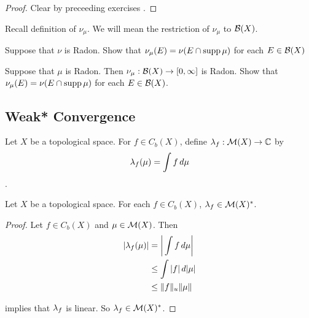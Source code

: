\documentclass{book}
\begin{document}
	\begin{proof}
		Clear by preceeding exercises .
	\end{proof}


	\begin{note}
		Recall definition of $\nu_\mu$. We will mean the restriction of $\nu_{\mu}$ to $\mathcal{B}(X)$.
	\end{note}

	\begin{ex}
		Suppose that $\nu$ is Radon. Show that $\nu_{\mu}(E) = \nu(E \cap \operatorname{supp} \mu)$ for each $E \in \mathcal{B}(X)$
	\end{ex}


	\begin{ex}
		Suppose that $\mu$ is Radon. Then $\nu_{\mu}: \mathcal{B}(X) \rightarrow [0,\infty]$ is Radon. Show that $\nu_{\mu}(E) = \nu(E \cap \operatorname{supp} \mu)$ for each $E \in \mathcal{B}(X)$. 
	\end{ex}








	
	
	
	
	
	
	
	
	
	
	
	
	
	
	
	
	
	
	
	
	
	
	
	
	
	
	
	\newpage	
	\subsection{Weak* Convergence}
	\begin{defn}
		Let $X$ be a topological space. For $f \in C_b(X)$, define $\lambda_f: \mathcal{M}(X) \rightarrow \mathbb{C}$ by $$\lambda_f(\mu) = \int f \, d \mu$$.
	\end{defn}
	
	\begin{ex}
		Let $X$ be a topological space. For each $f \in C_b(X)$, $\lambda_f \in \mathcal{M}(X)^*$. 
	\end{ex}
	
	\begin{proof}
		Let $f \in C_b(X)$ and $\mu \in \mathcal{M}(X)$. Then 
		\begin{align*}
			|\lambda_f(\mu)| 
			&= \bigg | \int f \, d \mu \bigg| \\
			&\leq \int |f| \, d |\mu| \\
			& \leq \|f\|_u \|\mu\|
		\end{align*}
		
		 implies that $\lambda_f$ is linear. So $\lambda_f \in \mathcal{M}(X)^*$.
	\end{proof}
	
\end{document}
